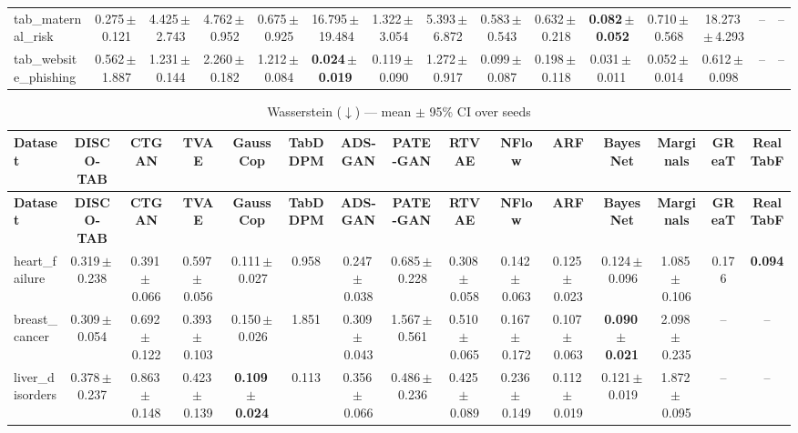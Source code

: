 \documentclass[8pt]{extarticle}
\begin{document}
\begin{longtable}{l*{14}{c}}
tab\_maternal\_risk & 0.275\,$\pm$\,0.121 & 4.425\,$\pm$\,2.743 & 4.762\,$\pm$\,0.952 & 0.675\,$\pm$\,0.925 & 16.795\,$\pm$\,19.484 & 1.322\,$\pm$\,3.054 & 5.393\,$\pm$\,6.872 & 0.583\,$\pm$\,0.543 & 0.632\,$\pm$\,0.218 & \textbf{0.082\,$\pm$\,0.052} & 0.710\,$\pm$\,0.568 & 18.273\,$\pm$\,4.293 & -- & -- \\
tab\_website\_phishing & 0.562\,$\pm$\,1.887 & 1.231\,$\pm$\,0.144 & 2.260\,$\pm$\,0.182 & 1.212\,$\pm$\,0.084 & \textbf{0.024\,$\pm$\,0.019} & 0.119\,$\pm$\,0.090 & 1.272\,$\pm$\,0.917 & 0.099\,$\pm$\,0.087 & 0.198\,$\pm$\,0.118 & 0.031\,$\pm$\,0.011 & 0.052\,$\pm$\,0.014 & 0.612\,$\pm$\,0.098 & -- & -- \\
\end{longtable}
\begin{longtable}{l*{14}{c}}
\caption{Wasserstein ($\downarrow$) --- mean $\pm$ 95\% CI over seeds}\\
\toprule
\textbf{Dataset} & \textbf{DISCO-TAB} & \textbf{CTGAN} & \textbf{TVAE} & \textbf{GaussCop} & \textbf{TabDDPM} & \textbf{ADS-GAN} & \textbf{PATE-GAN} & \textbf{RTVAE} & \textbf{NFlow} & \textbf{ARF} & \textbf{BayesNet} & \textbf{Marginals} & \textbf{GReaT} & \textbf{RealTabF} \\
\midrule
\endfirsthead
\toprule
\textbf{Dataset} & \textbf{DISCO-TAB} & \textbf{CTGAN} & \textbf{TVAE} & \textbf{GaussCop} & \textbf{TabDDPM} & \textbf{ADS-GAN} & \textbf{PATE-GAN} & \textbf{RTVAE} & \textbf{NFlow} & \textbf{ARF} & \textbf{BayesNet} & \textbf{Marginals} & \textbf{GReaT} & \textbf{RealTabF} \\
\midrule
\endhead
\bottomrule
\endfoot
heart\_failure & 0.319\,$\pm$\,0.238 & 0.391\,$\pm$\,0.066 & 0.597\,$\pm$\,0.056 & 0.111\,$\pm$\,0.027 & 0.958 & 0.247\,$\pm$\,0.038 & 0.685\,$\pm$\,0.228 & 0.308\,$\pm$\,0.058 & 0.142\,$\pm$\,0.063 & 0.125\,$\pm$\,0.023 & 0.124\,$\pm$\,0.096 & 1.085\,$\pm$\,0.106 & 0.176 & \textbf{0.094} \\
breast\_cancer & 0.309\,$\pm$\,0.054 & 0.692\,$\pm$\,0.122 & 0.393\,$\pm$\,0.103 & 0.150\,$\pm$\,0.026 & 1.851 & 0.309\,$\pm$\,0.043 & 1.567\,$\pm$\,0.561 & 0.510\,$\pm$\,0.065 & 0.167\,$\pm$\,0.172 & 0.107\,$\pm$\,0.063 & \textbf{0.090\,$\pm$\,0.021} & 2.098\,$\pm$\,0.235 & -- & -- \\
liver\_disorders & 0.378\,$\pm$\,0.237 & 0.863\,$\pm$\,0.148 & 0.423\,$\pm$\,0.139 & \textbf{0.109\,$\pm$\,0.024} & 0.113 & 0.356\,$\pm$\,0.066 & 0.486\,$\pm$\,0.236 & 0.425\,$\pm$\,0.089 & 0.236\,$\pm$\,0.149 & 0.112\,$\pm$\,0.019 & 0.121\,$\pm$\,0.019 & 1.872\,$\pm$\,0.095 & -- & -- \\

\end{longtable}
\end{document}
